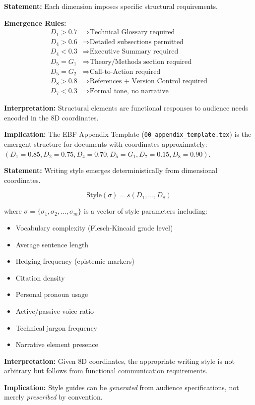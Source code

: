 \begin{tcolorbox}[colback=gray!5!white, colframe=gray!75!black,
    title=Axiom DT-6: Structural Element Rules]
\textbf{Statement:} Each dimension imposes specific structural requirements.

\textbf{Emergence Rules:}
\begin{align}
D_1 > 0.7 &\Rightarrow \text{Technical Glossary required} \\
D_4 > 0.6 &\Rightarrow \text{Detailed subsections permitted} \\
D_4 < 0.3 &\Rightarrow \text{Executive Summary required} \\
D_5 = G_1 &\Rightarrow \text{Theory/Methods section required} \\
D_5 = G_2 &\Rightarrow \text{Call-to-Action required} \\
D_8 > 0.8 &\Rightarrow \text{References + Version Control required} \\
D_7 < 0.3 &\Rightarrow \text{Formal tone, no narrative}
\end{align}

\textbf{Interpretation:} Structural elements are functional responses to audience needs
encoded in the 8D coordinates.

\textbf{Implication:} The EBF Appendix Template (\texttt{00\_appendix\_template.tex})
is the emergent structure for documents with coordinates approximately:
$(D_1=0.85, D_2=0.75, D_4=0.70, D_5=G_1, D_7=0.15, D_8=0.90)$.
\end{tcolorbox}

\begin{tcolorbox}[colback=gray!5!white, colframe=gray!75!black,
    title=Axiom DT-7: Style Emergence]
\textbf{Statement:} Writing style emerges deterministically from dimensional coordinates.

\begin{equation}
\text{Style}(\sigma) = s(D_1, ..., D_8)
\end{equation}

where $\sigma = \{\sigma_1, \sigma_2, ..., \sigma_m\}$ is a vector of style parameters including:
\begin{itemize}[nosep]
\item Vocabulary complexity (Flesch-Kincaid grade level)
\item Average sentence length
\item Hedging frequency (epistemic markers)
\item Citation density
\item Personal pronoun usage
\item Active/passive voice ratio
\item Technical jargon frequency
\item Narrative element presence
\end{itemize}

\textbf{Interpretation:} Given 8D coordinates, the appropriate writing style is not arbitrary
but follows from functional communication requirements.

\textbf{Implication:} Style guides can be \textit{generated} from audience specifications,
not merely \textit{prescribed} by convention.
\end{tcolorbox}

